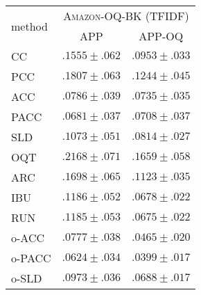 \begin{tabular}{lcc}
  \toprule
  \multirow{2}{*}{method} & \multicolumn{2}{c}{\textsc{Amazon-OQ-BK} (TFIDF)} \\
  & APP & APP-OQ \\
  \midrule
  CC & ${.1555 \pm .062}$ & ${.0953 \pm .033}$ \\
  PCC & ${.1807 \pm .063}$ & ${.1244 \pm .045}$ \\
  ACC & ${.0786 \pm .039}$ & ${.0735 \pm .035}$ \\
  PACC & ${.0681 \pm .037}$ & ${.0708 \pm .037}$ \\
  SLD & ${.1073 \pm .051}$ & ${.0814 \pm .027}$ \\[.5em]
  OQT & ${.2168 \pm .071}$ & ${.1659 \pm .058}$ \\
  ARC & ${.1698 \pm .065}$ & ${.1123 \pm .035}$ \\
  IBU & ${.1186 \pm .052}$ & ${.0678 \pm .022}$ \\
  RUN & ${.1185 \pm .053}$ & ${.0675 \pm .022}$ \\[.5em]
  o-ACC & ${.0777 \pm .038}$ & ${.0465 \pm .020}$ \\
  o-PACC & $\mathbf{.0624 \pm .034}$ & $\mathbf{.0399 \pm .017}$ \\
  o-SLD & ${.0973 \pm .036}$ & ${.0688 \pm .017}$ \\
  \bottomrule
\end{tabular}
